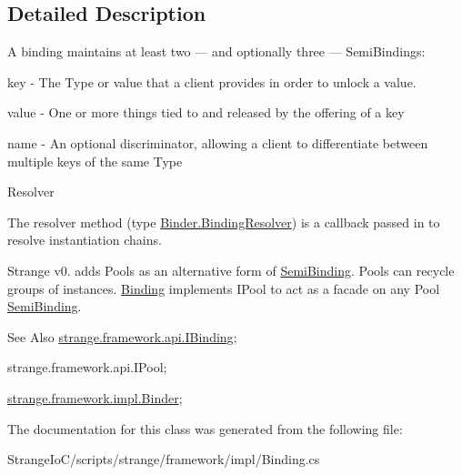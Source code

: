 \subsection{Detailed Description}
A binding maintains at least two — and optionally three — Semi\-Bindings\-: 


\begin{DoxyItemize}
\item key -\/ The Type or value that a client provides in order to unlock a value. 
\item value -\/ One or more things tied to and released by the offering of a key 
\item name -\/ An optional discriminator, allowing a client to differentiate between multiple keys of the same Type 
\end{DoxyItemize}

Resolver

The resolver method (type \hyperlink{classstrange_1_1framework_1_1impl_1_1_binder_aa4e977fc31063ca4d0b029b1abe39dad}{Binder.\-Binding\-Resolver}) is a callback passed in to resolve instantiation chains.

Strange v0. adds Pools as an alternative form of \hyperlink{classstrange_1_1framework_1_1impl_1_1_semi_binding}{Semi\-Binding}. Pools can recycle groups of instances. \hyperlink{classstrange_1_1framework_1_1impl_1_1_binding}{Binding} implements I\-Pool to act as a facade on any Pool \hyperlink{classstrange_1_1framework_1_1impl_1_1_semi_binding}{Semi\-Binding}.

\begin{DoxySeeAlso}{See Also}
\hyperlink{interfacestrange_1_1framework_1_1api_1_1_i_binding}{strange.\-framework.\-api.\-I\-Binding}; 

strange.\-framework.\-api.\-I\-Pool; 

\hyperlink{classstrange_1_1framework_1_1impl_1_1_binder}{strange.\-framework.\-impl.\-Binder}; 
\end{DoxySeeAlso}


The documentation for this class was generated from the following file\-:\begin{DoxyCompactItemize}
\item 
Strange\-Io\-C/scripts/strange/framework/impl/Binding.\-cs\end{DoxyCompactItemize}
